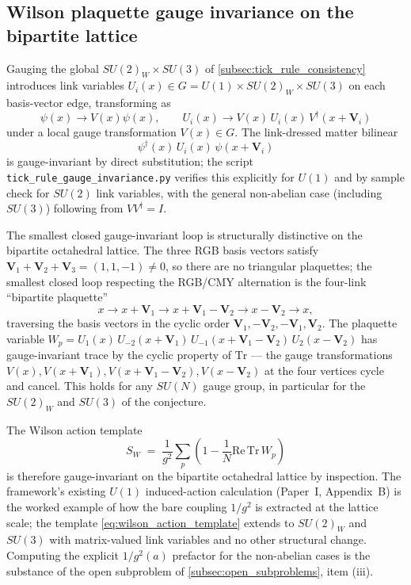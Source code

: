 \subsection{Wilson plaquette gauge invariance on the bipartite lattice}
\label{subsec:wilson_plaquette}

Gauging the global $SU(2)_W \times SU(3)$ of
\autoref{subsec:tick_rule_consistency} introduces link variables
$U_i(x) \in G = U(1) \times SU(2)_W \times SU(3)$ on each
basis-vector edge, transforming as
\[
\psi(x) \to V(x)\psi(x),\qquad
U_i(x) \to V(x)\, U_i(x)\, V^\dagger(x + \mathbf{V}_i)
\]
under a local gauge transformation $V(x) \in G$.  The link-dressed
matter bilinear
\[
\psi^\dagger(x)\, U_i(x)\, \psi(x + \mathbf{V}_i)
\]
is gauge-invariant by direct substitution; the script
\nolinkurl{tick_rule_gauge_invariance.py} verifies this explicitly
for $U(1)$ and by sample check for $SU(2)$ link variables, with the
general non-abelian case (including $SU(3)$) following from
$V V^\dagger = I$.

The smallest closed gauge-invariant loop is structurally distinctive
on the bipartite octahedral lattice.  The three RGB basis vectors
satisfy $\mathbf{V}_1 + \mathbf{V}_2 + \mathbf{V}_3 = (1, 1, -1)
\neq 0$, so there are no triangular plaquettes; the smallest
closed loop respecting the RGB/CMY alternation is the four-link
``bipartite plaquette''
\[
x \to x + \mathbf{V}_1 \to x + \mathbf{V}_1 - \mathbf{V}_2 \to
x - \mathbf{V}_2 \to x,
\]
traversing the basis vectors in the cyclic order $\mathbf{V}_1,
-\mathbf{V}_2, -\mathbf{V}_1, \mathbf{V}_2$.  The plaquette variable
$W_p = U_1(x)\, U_{-2}(x + \mathbf{V}_1)\, U_{-1}(x + \mathbf{V}_1
- \mathbf{V}_2)\, U_2(x - \mathbf{V}_2)$ has gauge-invariant trace
by the cyclic property of $\mathrm{Tr}$ --- the gauge
transformations $V(x), V(x + \mathbf{V}_1), V(x + \mathbf{V}_1 -
\mathbf{V}_2), V(x - \mathbf{V}_2)$ at the four vertices cycle and
cancel.  This holds for any $SU(N)$ gauge group, in particular for
the $SU(2)_W$ and $SU(3)$ of the conjecture.

The Wilson action template
\begin{equation}
\label{eq:wilson_action_template}
S_W \;=\; \frac{1}{g^2} \sum_p \left(1 - \frac{1}{N}
\mathrm{Re}\,\mathrm{Tr}\, W_p\right)
\end{equation}
is therefore gauge-invariant on the bipartite octahedral lattice
by inspection.  The framework's existing $U(1)$ induced-action
calculation (Paper~I, Appendix~B) is the worked example of how the
bare coupling $1/g^2$ is extracted at the lattice scale; the
template \eqref{eq:wilson_action_template} extends to $SU(2)_W$ and
$SU(3)$ with matrix-valued link variables and no other structural
change.  Computing the explicit $1/g^2(a)$ prefactor for the
non-abelian cases is the substance of the open subproblem of
\autoref{subsec:open_subproblems}, item (iii).

